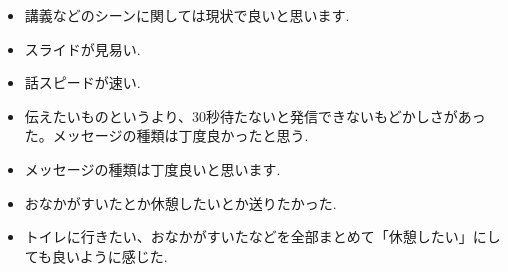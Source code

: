 \documentclass{funthesis}
\begin{document}
\begin{itemize}
 \item 講義などのシーンに関しては現状で良いと思います.\\
 \item スライドが見易い.\\
 \item 話スピードが速い.\\
 \item 伝えたいものというより、30秒待たないと発信できないもどかしさがあった。メッセージの種類は丁度良かったと思う.\\
 \item メッセージの種類は丁度良いと思います.\\
 \item おなかがすいたとか休憩したいとか送りたかった.\\
 \item トイレに行きたい、おなかがすいたなどを全部まとめて「休憩したい」にしても良いように感じた.\\
\end{itemize}
\end{document}
